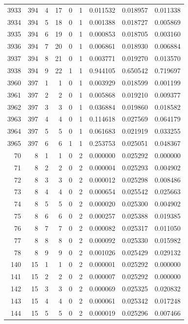 \begin{longtable}{rrrrrrrrr}
3933 & 394 & 4 & 17 & 0 & 1 & 0.011532 & 0.018957 & 0.011338 \\
3934 & 394 & 5 & 18 & 0 & 1 & 0.001388 & 0.018727 & 0.005869 \\
3935 & 394 & 6 & 19 & 0 & 1 & 0.000853 & 0.018705 & 0.003160 \\
3936 & 394 & 7 & 20 & 0 & 1 & 0.006861 & 0.018930 & 0.006884 \\
3937 & 394 & 8 & 21 & 0 & 1 & 0.003771 & 0.019270 & 0.013570 \\
3938 & 394 & 9 & 22 & 1 & 1 & 0.944105 & 0.650542 & 0.719697 \\
3960 & 397 & 1 & 1 & 0 & 1 & 0.003929 & 0.018599 & 0.001199 \\
3961 & 397 & 2 & 2 & 0 & 1 & 0.005868 & 0.019210 & 0.009377 \\
3962 & 397 & 3 & 3 & 0 & 1 & 0.036884 & 0.019860 & 0.018582 \\
3963 & 397 & 4 & 4 & 0 & 1 & 0.114618 & 0.027569 & 0.064179 \\
3964 & 397 & 5 & 5 & 0 & 1 & 0.061683 & 0.021919 & 0.033255 \\
3965 & 397 & 6 & 6 & 1 & 1 & 0.253753 & 0.025051 & 0.048367 \\
70 & 8 & 1 & 1 & 0 & 2 & 0.000000 & 0.025292 & 0.000000 \\
71 & 8 & 2 & 2 & 0 & 2 & 0.000004 & 0.025293 & 0.004902 \\
72 & 8 & 3 & 3 & 0 & 2 & 0.000012 & 0.025298 & 0.008486 \\
73 & 8 & 4 & 4 & 0 & 2 & 0.000654 & 0.025542 & 0.025663 \\
74 & 8 & 5 & 5 & 0 & 2 & 0.000020 & 0.025300 & 0.004902 \\
75 & 8 & 6 & 6 & 0 & 2 & 0.000257 & 0.025388 & 0.019385 \\
76 & 8 & 7 & 7 & 0 & 2 & 0.000082 & 0.025317 & 0.011050 \\
77 & 8 & 8 & 8 & 0 & 2 & 0.000092 & 0.025330 & 0.015982 \\
78 & 8 & 9 & 9 & 0 & 2 & 0.001026 & 0.025429 & 0.029132 \\
140 & 15 & 1 & 1 & 0 & 2 & 0.000001 & 0.025292 & 0.000000 \\
141 & 15 & 2 & 2 & 0 & 2 & 0.000007 & 0.025292 & 0.000000 \\
142 & 15 & 3 & 3 & 0 & 2 & 0.000069 & 0.025325 & 0.020832 \\
143 & 15 & 4 & 4 & 0 & 2 & 0.000061 & 0.025342 & 0.017248 \\
144 & 15 & 5 & 5 & 0 & 2 & 0.000019 & 0.025296 & 0.007466 \\

\end{longtable}
